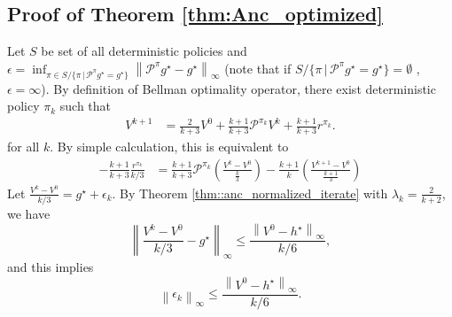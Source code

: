 \documentclass{article} %
\newcommand{\cP}{\mathcal{P}}
\newcommand*{\para}[1]{\left({#1}\right)}
\newcommand*{\infn}[1]{\left\|{#1}\right\|_{\infty}}
\begin{document}

\subsection{Proof of Theorem \ref{thm:Anc_optimized} }
 Let $S$ be set of all deterministic policies and $\epsilon=\inf_{\pi \in S/\{\pi \,|\, \cP^{\pi}g^{\star} =  g^{\star}\}} \infn{\cP^{\pi}g^{\star}-g^{\star}}$ (note that if $S/\{\pi \,|\, \cP^{\pi}g^{\star} =  g^{\star}\} = \emptyset $ , $\epsilon =\infty$). By definition of Bellman optimality operator, there exist deterministic policy $\pi_k$ such that 
  \begin{align*}
        V^{k+1} &= \frac{2}{k+3}V^{0}+\frac{k+1}{k+3}\cP^{\pi_k}V^{k} + \frac{k+1}{k+3}r^{\pi_k}.
    \end{align*}
    for all $k$. By simple calculation, this is equivalent to
           \begin{align*}
        -\frac{k+1}{k+3}\frac{r^{\pi_k}}{k/3} &= \frac{k+1}{k+3}\cP^{\pi_k}\para{\frac{V^{k}-V^0}{\frac{k}{3}} }-\frac{k+1}{k}\para{\frac{V^{k+1}-V^0}{\frac{k+1}{3}}}
        \end{align*}
        Let $\frac{V^k-V^0}{k/3} = g^{\star}+ \epsilon_k$. By Theorem \ref{thm::anc_normalized_iterate} with $\lambda_k =\frac{2}{k+2}$, we have
    \[\infn{\frac{V^k-V^0}{k/3}-g^{\star}} \le \frac{\infn{V^0-h^{\star}}}{k/6},\]
    and this implies 
        \[\infn{\epsilon_k} \le \frac{\infn{V^0-h^{\star}}}{k/6}.\]
\end{document}
